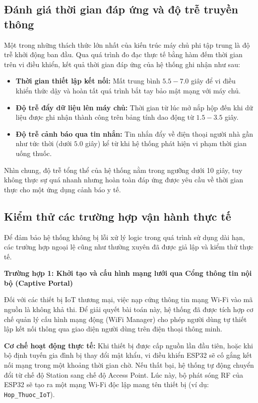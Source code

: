 \documentclass[12pt, a4paper, oneside]{article}
\begin{document}
\subsection{Đánh giá thời gian đáp ứng và độ trễ truyền thông}
Một trong những thách thức lớn nhất của kiến trúc máy chủ phi tập trung là độ trễ khởi động ban đầu. Qua quá trình đo đạc thực tế bằng hàm đếm thời gian trên vi điều khiển, kết quả thời gian đáp ứng của hệ thống ghi nhận như sau:
\begin{itemize}
    \item \textbf{Thời gian thiết lập kết nối:} Mất trung bình $5.5 - 7.0$ giây để vi điều khiển thức dậy và hoàn tất quá trình bắt tay bảo mật mạng với máy chủ.
    \item \textbf{Độ trễ đẩy dữ liệu lên máy chủ:} Thời gian từ lúc mở nắp hộp đến khi dữ liệu được ghi nhận thành công trên bảng tính dao động từ $1.5- 3.5$ giây.
    \item \textbf{Độ trễ cảnh báo qua tin nhắn:} Tin nhắn đẩy về điện thoại người nhà gần như tức thời (dưới $5.0$ giây) kể từ khi hệ thống phát hiện vi phạm thời gian uống thuốc.
\end{itemize}
Nhìn chung, độ trễ tổng thể của hệ thống nằm trong ngưỡng dưới 10 giây, tuy không thực sự quá nhanh nhưng hoàn toàn đáp ứng được yêu cầu về thời gian thực cho một ứng dụng cảnh báo y tế.

\subsection{Kiểm thử các trường hợp vận hành thực tế}
Để đảm bảo hệ thống không bị lỗi xử lý logic trong quá trình sử dụng dài hạn, các trường hợp ngoại lệ cũng như thường xuyên đã được giả lập và kiểm thử thực tế.

\textbf{Trường hợp 1: Khởi tạo và cấu hình mạng lưới qua Cổng thông tin nội bộ (Captive Portal)}

Đối với các thiết bị IoT thương mại, việc nạp cứng thông tin mạng Wi-Fi vào mã nguồn là không khả thi. Để giải quyết bài toán này, hệ thống đã được tích hợp cơ chế quản lý cấu hình mạng động (WiFi Manager) cho phép người dùng tự thiết lập kết nối thông qua giao diện người dùng trên điện thoại thông minh.

\textbf{Cơ chế hoạt động thực tế:} 
Khi thiết bị được cấp nguồn lần đầu tiên, hoặc khi bộ định tuyến gia đình bị thay đổi mật khẩu, vi điều khiển ESP32 sẽ cố gắng kết nối mạng trong một khoảng thời gian chờ. Nếu thất bại, hệ thống tự động chuyển đổi từ chế độ Station sang chế độ Access Point. Lúc này, bộ phát sóng RF của ESP32 sẽ tạo ra một mạng Wi-Fi độc lập mang tên thiết bị (ví dụ: \texttt{Hop\_Thuoc\_IoT}). 
\end{document}
